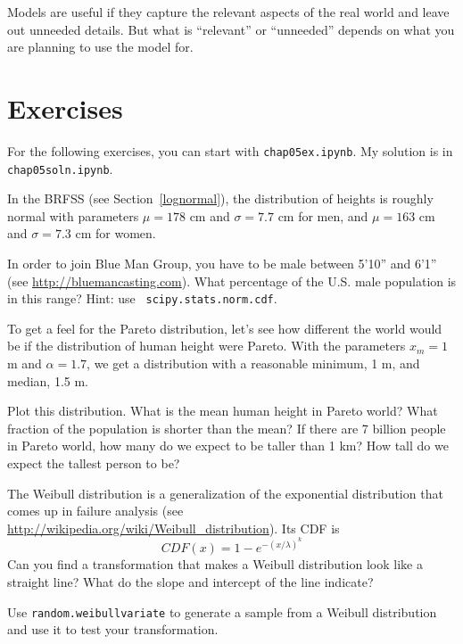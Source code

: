 Models are useful if they capture the relevant aspects of the
real world and leave out unneeded details.  But what is ``relevant''
or ``unneeded'' depends on what you are planning to use the model
for.


\section{Exercises}

For the following exercises, you can start with \verb"chap05ex.ipynb".
My solution is in \verb"chap05soln.ipynb".

\begin{exercise}
In the BRFSS (see Section~\ref{lognormal}), the distribution of
heights is roughly normal with parameters $\mu = 178$ cm and
$\sigma = 7.7$ cm for men, and $\mu = 163$ cm and $\sigma = 7.3$ cm for
women.

In order to join Blue Man Group, you have to be male between 5'10''
and 6'1'' (see \url{http://bluemancasting.com}).  What percentage of
the U.S. male population is in this range?  Hint: use {\tt
  scipy.stats.norm.cdf}.

\end{exercise}


\begin{exercise}
To get a feel for the Pareto distribution, let's see how different
the world
would be if the distribution of human height were Pareto.
With the parameters $x_{m} = 1$ m and $\alpha = 1.7$, we
get a distribution with a reasonable minimum, 1 m,
and median, 1.5 m.

Plot this distribution.  What is the mean human height in Pareto
world?  What fraction of the population is shorter than the mean?  If
there are 7 billion people in Pareto world, how many do we expect to
be taller than 1 km?  How tall do we expect the tallest person to be?

\end{exercise}


\begin{exercise}
\label{weibull}

The Weibull distribution is a generalization of the exponential
distribution that comes up in failure analysis
(see \url{http://wikipedia.org/wiki/Weibull_distribution}).  Its CDF is
%
\[ CDF(x) = 1 - e^{-(x / \lambda)^k} \]
%
Can you find a transformation that makes a Weibull distribution look
like a straight line?  What do the slope and intercept of the
line indicate?

Use {\tt random.weibullvariate} to generate a sample from a
Weibull distribution and use it to test your transformation.

\end{exercise}


